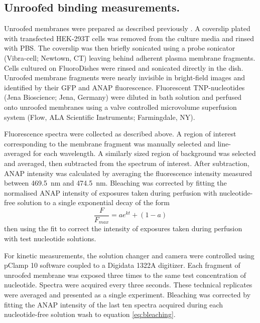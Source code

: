 \documentclass[9pt,lineno, onehalfspacing]{elife_modified}
\begin{document}
\subsection{Unroofed binding measurements.}
Unroofed membranes were prepared as described previously \citep{RN21, RN22, RN80}.
A coverslip plated with transfected HEK-293T cells was removed from the culture media and rinsed with PBS.
The coverslip was then briefly sonicated using a probe sonicator (Vibra-cell; Newtown, CT) leaving behind adherent plasma membrane fragments.
Cells cultured on FluoroDishes were rinsed and sonicated directly in the dish.
Unroofed membrane fragments were nearly invisible in bright-field images and identified by their GFP and ANAP fluorescence.
Fluorescent TNP-nucleotides (Jena Bioscience; Jena, Germany) were diluted in bath solution and perfused onto unroofed membranes using a valve controlled microvolume superfusion system (\si{\micro}Flow, ALA Scientific Instruments; Farmingdale, NY).

Fluorescence spectra were collected as described above.
A region of interest corresponding to the membrane fragment was manually selected and line-averaged for each wavelength.
A similarly sized region of background was selected and averaged, then subtracted from the spectrum of interest.
After subtraction, ANAP intensity was calculated by averaging the fluorescence intensity measured between \SI{469.5}{\nano\metre} and \SI{474.5}{\nano\metre}.
Bleaching was corrected by fitting the normalised ANAP intensity of exposures taken during perfusion with nucleotide-free solution to a single exponential decay of the form
\begin{equation} \label{eq:bleaching}
    \frac{F}{F_{max}} = ae^{kt} + (1 - a)
\end{equation}
then using the fit to correct the intensity of exposures taken during perfusion with test nucleotide solutions.

For kinetic measurements, the solution changer and camera were controlled using pClamp 10 software coupled to a Digidata 1322A digitizer.
Each fragment of unroofed membrane was exposed three times to the same test concentration of nucleotide.
Spectra were acquired every three seconds.
These technical replicates were averaged and presented as a single experiment.
Bleaching was corrected by fitting the ANAP intensity of the last ten spectra acquired during each nucleotide-free solution wash to equation \ref{eq:bleaching}.
\end{document}
